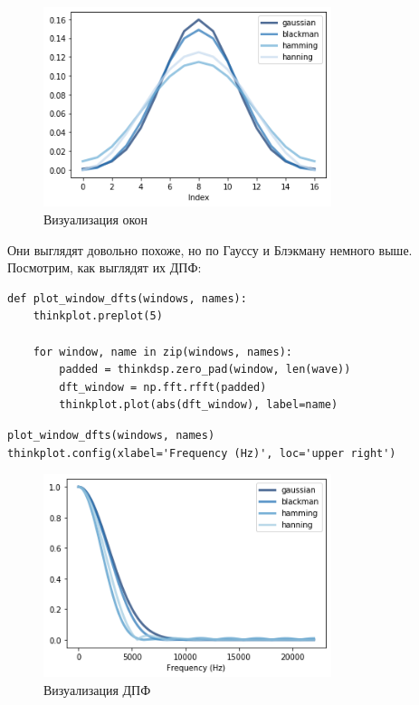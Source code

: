 \documentclass[a4paper,12pt]{report}
\begin{document}
\begin{figure}[H]
        \centering
        \includegraphics[width=0.75\textwidth]{lab8_fig3_1.png}
        \caption{Визуализация окон}
        \label{fig:lab8_fig3_1}
\end{figure}

Они выглядят довольно похоже, но по Гауссу и Блэкману немного выше. Посмотрим, как выглядят их ДПФ:

\begin{lstlisting}[caption=Функция \texttt{plot\_window\_dfts}]
def plot_window_dfts(windows, names):
    thinkplot.preplot(5)

    for window, name in zip(windows, names):
        padded = thinkdsp.zero_pad(window, len(wave))
        dft_window = np.fft.rfft(padded)
        thinkplot.plot(abs(dft_window), label=name)
\end{lstlisting}

\begin{lstlisting}[caption=Визуализация ДПФ]
plot_window_dfts(windows, names)
thinkplot.config(xlabel='Frequency (Hz)', loc='upper right')
\end{lstlisting}

\begin{figure}[H]
        \centering
        \includegraphics[width=0.75\textwidth]{lab8_fig3_2.png}
        \caption{Визуализация ДПФ}
        \label{fig:lab8_fig3_2}
\end{figure}
\end{document}
